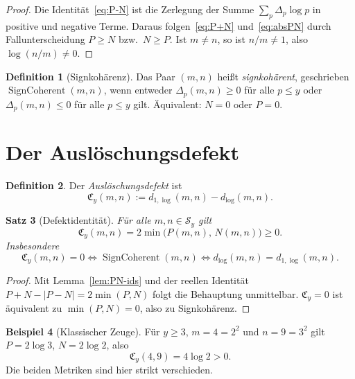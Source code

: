 \documentclass[11pt,a4paper]{article}
\newtheorem{theorem}{Satz}
\theoremstyle{definition}
\newtheorem{definition}[theorem]{Definition}
\newtheorem{example}[theorem]{Beispiel}
\newcommand{\Sy}{\mathcal{S}_y}
\newcommand{\dlog}{d_{\log}}
\newcommand{\dlogone}{d_{1,\log}}
\newcommand{\Cy}{\mathfrak{C}_y}
\newcommand{\SignCoh}{\operatorname{SignCoherent}}
\begin{document}
	\begin{proof}
		Die Identit{\"a}t~\eqref{eq:P-N} ist die Zerlegung der Summe
		$\sum_p\Delta_p\log p$ in positive und negative Terme.
		Daraus folgen~\eqref{eq:P+N} und~\eqref{eq:absPN} durch
		Fallunterscheidung $P\ge N$ bzw.\ $N\ge P$.
		Ist $m\neq n$, so ist $n/m\neq 1$, also $\log(n/m)\neq 0$.
	\end{proof}
	
	\begin{definition}[Signkoh{\"a}renz]
		\label{def:signcoherent}
		Das Paar $(m,n)$ hei{\ss}t \emph{signkoh{\"a}rent}, geschrieben
		$\SignCoh(m,n)$, wenn entweder $\Delta_p(m,n)\ge 0$ f{\"u}r alle $p\le y$
		oder $\Delta_p(m,n)\le 0$ f{\"u}r alle $p\le y$ gilt.
		{\"A}quivalent: $N=0$ oder $P=0$.
	\end{definition}
	
	\section{Der Ausl{\"o}schungsdefekt}
	\label{sec:defect}
	
	\begin{definition}
		\label{def:C}
		Der \emph{Ausl{\"o}schungsdefekt} ist
		\[
		\Cy(m,n)
		:=
		\dlogone(m,n)-\dlog(m,n).
		\]
	\end{definition}
	
	\begin{theorem}[Defektidentit{\"a}t]
		\label{thm:C}
		F{\"u}r alle $m,n\in\Sy$ gilt
		\[
		\Cy(m,n)
		=
		2\min\bigl(P(m,n),\,N(m,n)\bigr)\ge 0.
		\]
		Insbesondere
		\[
		\Cy(m,n)=0
		\iff
		\SignCoh(m,n)
		\iff
		\dlog(m,n)=\dlogone(m,n).
		\]
	\end{theorem}
	
	\begin{proof}
		Mit Lemma~\ref{lem:PN-ids} und der reellen Identit{\"a}t
		$P+N-\lvert P-N\rvert=2\min(P,N)$ folgt die Behauptung unmittelbar.
		$\Cy=0$ ist {\"a}quivalent zu $\min(P,N)=0$, also zu Signkoh{\"a}renz.
	\end{proof}
	
	\begin{example}[Klassischer Zeuge]
		\label{ex:4-9}
		F{\"u}r $y\ge 3$, $m=4=2^2$ und $n=9=3^2$ gilt
		$P=2\log 3$, $N=2\log 2$, also
		\[
		\Cy(4,9)=4\log 2>0.
		\]
		Die beiden Metriken sind hier strikt verschieden.
	\end{example}
	
\end{document}
